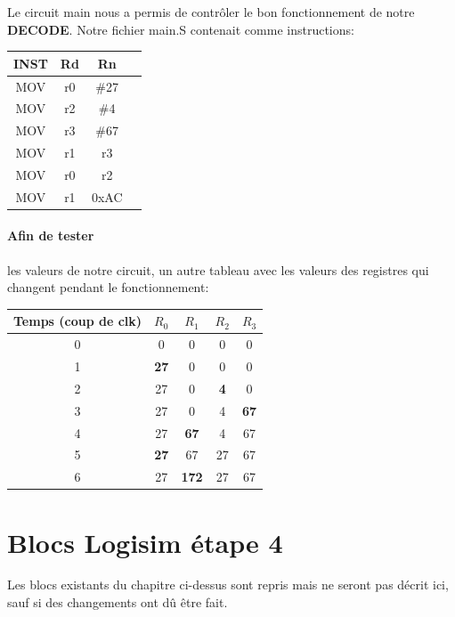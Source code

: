 \documentclass[a4paper]{article} %
\begin{document}
Le circuit main nous a permis de contrôler le bon fonctionnement de notre \textbf{DECODE}. Notre fichier main.S contenait comme instructions:\\

\begin{tabular}{|c|c|c|c|}    
    \hline
    INST & Rd & Rn \\
    \hline
    MOV  & r0 & \#27    \\
    \hline
    MOV  & r2 & \#4    \\
    \hline
    MOV  & r3 & \#67    \\
    \hline
    MOV  & r1 & r3  \\
    \hline
    MOV  & r0 & r2 \\
    \hline
    MOV  & r1 & 0xAC    \\
    \hline
\end{tabular}

\paragraph{Afin de tester} les valeurs de notre circuit, un autre tableau avec les valeurs des registres qui changent pendant le fonctionnement:\\

\begin{tabular}{|c|c|c|c|c|}    
    \hline
    Temps (coup de clk) & $R_0$ & $R_1$          & $R_2$          & $R_3$ \\
    \hline
    0                   & 0     & 0              & 0              & 0 \\
    \hline
    1                   & \textbf{27}            & 0     & 0     & 0   \\
    \hline
    2                   & 27    & 0              & \textbf{4}     & 0 \\
    \hline
    3                   & 27    & 0              & 4              & \textbf{67}  \\
    \hline
    4                   & 27    & \textbf{67}    & 4     & 67\\
    \hline
    5                   & \textbf{27}    & 67    & 27    & 67 \\
    \hline
    6                   & 27    & \textbf{172}    & 27    & 67\\
    \hline
\end{tabular}

    
    
\section{Blocs Logisim étape 4}
Les blocs existants du chapitre ci-dessus sont repris mais ne seront pas décrit ici, sauf si des changements ont dû être fait.
\end{document}
